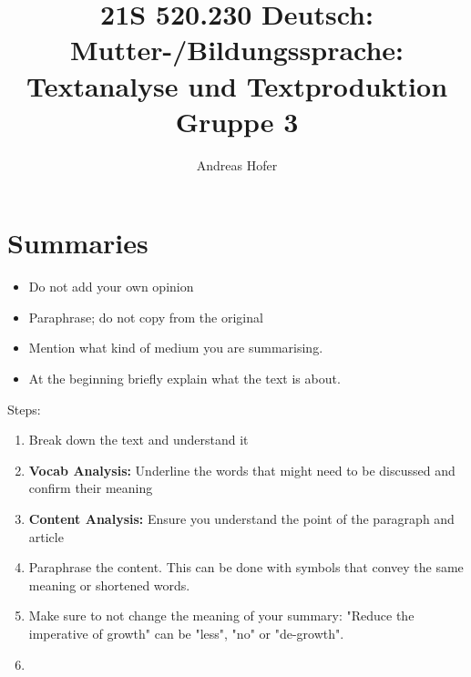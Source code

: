 \documentclass{article}
\title{21S 520.230 Deutsch: Mutter-/Bildungssprache: Textanalyse und Textproduktion Gruppe 3}
\author{Andreas Hofer}
\begin{document}
	\section{Summaries}
	\begin{itemize}
		\item{Do not add your own opinion}
		\item{Paraphrase; do not copy from the original}
		\item{Mention what kind of medium you are summarising.}
		\item{At the beginning briefly explain what the text is about.}
	\end{itemize}
	Steps:
	\begin{enumerate}
		\item{Break down the text and understand it}
		\item{\textbf{Vocab Analysis:} Underline the words that might need to be discussed and confirm their meaning}
		\item{\textbf{Content Analysis:} Ensure you understand the point of the paragraph and article}
		\item{Paraphrase the content. This can be done with symbols that convey the same meaning or shortened words.}
		\item{Make sure to not change the meaning of your summary: "Reduce the imperative of growth" can be "less", "no" or "de-growth".}
		\item{}
	\end{enumerate}

	
\end{document}
